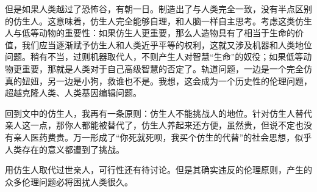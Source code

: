 \documentclass{article}
\begin{document}
	但是如果人类越过了恐怖谷，有朝一日。制造出了与人类完全一致，没有半点区别的仿生人。这意味着，仿生人完全能够自理，和人脑一样自主思考。考虑这类仿生人与低等动物的重要性：如果仿生人更重要，那么人造物具有了相当于生命的价值，我们应当逐渐赋予仿生人和人类近乎平等的权利，这就又涉及机器和人类地位问题。稍有不当，过则机器取代人，不则产生人对智慧“生命”的奴役；如果低等动物更重要，那就是人类对于自己高级智慧的否定了。轨道问题，一边是一个完全仿真的妞妞，另一边是小狗，救谁也不是。我想，这会成为一个历史性的伦理问题，超越克隆人类、人类基因编辑问题。

	回到文中的仿生人，我再有一条原则：仿生人不能挑战人的地位。针对仿生人替代亲人这一点，那你人都能被替代了，仿生人养起来还方便，虽然贵，但说不定也没有亲人医药费贵。万一形成了“你死就死呗，我买个仿生的代替”的社会思想，似乎人类存在的意义都遭到了挑战。

	用仿生人取代过世亲人，可行性还有待讨论。但是其确实违反的伦理原则，产生的众多伦理问题必将困扰人类很久。
\end{document}
